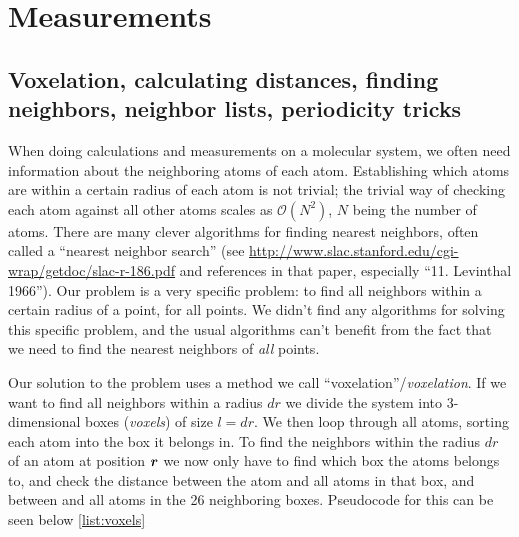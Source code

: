 \chapter{Measurements}
\section{Voxelation, calculating distances, finding neighbors, neighbor lists, periodicity tricks\label{sec:voxelation}}
When doing calculations and measurements on a molecular system, we often need information about the neighboring atoms of each atom. Establishing which atoms are within a certain radius of each atom is not trivial; the trivial way of checking each atom against all other atoms scales as $\mathcal{O}(N^2)$, $N$ being the number of atoms. There are many clever algorithms for finding nearest neighbors, often called a ``nearest neighbor search'' (see \url{http://www.slac.stanford.edu/cgi-wrap/getdoc/slac-r-186.pdf} and references in that paper, especially ``11. Levinthal 1966''). Our problem is a very specific problem: to find all neighbors within a certain radius of a point, for all points. We didn't find any algorithms for solving this specific problem, and the usual algorithms can't benefit from the fact that we need to find the nearest neighbors of \emph{all} points.

Our solution to the problem uses a method we call ``voxelation''/\emph{voxelation}. If we want to find all neighbors within a radius $dr$ we divide the system into 3-dimensional boxes (\emph{voxels}) of size $l = dr$. We then loop through all atoms, sorting each atom into the box it belongs in. To find the neighbors within the radius $dr$ of an atom at position $\bm{r}$ we now only have to find which box the atoms belongs to, and check the distance between the atom and all atoms in that box, and between and all atoms in the 26 neighboring boxes. Pseudocode for this can be seen below \cref{list:voxels}


